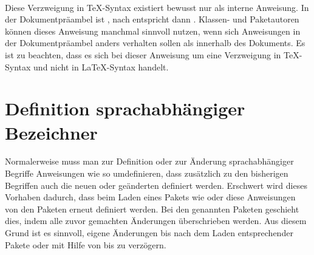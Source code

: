 \begin{Declaration}[0]
  \ \ %
  \  
\end{Declaration}
\iftrue%
Diese Verzweigung in \TeX-Syntax existiert bewusst nur als interne
Anweisung. In der Dokumentpräambel ist 
, nach  entspricht
 dann .  Klassen- und Paketautoren
können dieses Anweisung manchmal sinnvoll nutzen, %
\else%
In der Dokumentpräambel enspricht \Macro{if@atdocument} \iftrue dem Schalter
\fi \Macro{iffalse}, nach \Macro{begin}\PParameter{document} hingegen
\Macro{iftrue}.  Klassen- und Paketautoren können dieses Anweisung nutzen, %
\fi%
wenn sich Anweisungen in der Dokumentpräambel anders verhalten sollen als
innerhalb des Dokuments. Es ist zu beachten, dass es sich
bei dieser Anweisung um eine Verzweigung in \TeX-Syntax und nicht in
\LaTeX-Syntax handelt.%
\EndIndexGroup


\section{Definition sprachabhängiger Bezeichner}
\BeginIndexGroup
{}

\iffalse%
Anfänger haben häufig Probleme damit, sprachabhängige Begriffe wie
\Macro{listfigurename}\IndexCmd{listfigurename}, in der Voreinstellung meist
»List of Figures« beziehungsweise in Deutsch: »Abbildungsverzeichnis«, zu
ändern. Werden diese beispielsweise einfach mit \Macro{renewcommand} in der
Dokumentpräambel umdefiniert, so überleben sie eine spätere Umschaltung der
Sprache nicht. Bei Verwendung von \Package{babel}\IndexCmd{babel} wird die
Umdefinierung in der Dokumentpräambel bereits von
\Macro{begin}\PParameter{document} wieder überschrieben.
\fi

Normalerweise muss man zur Definition oder zur Änderung sprachabhängiger
Begriffe Anweisungen wie  so umdefinieren, dass
zusätzlich zu den bisherigen Begriffen auch die neuen oder geänderten
definiert werden. Erschwert wird dieses Vorhaben dadurch, dass beim Laden
eines Pakets wie  oder
 diese Anweisungen von den
Paketen erneut definiert werden. Bei den genannten Paketen geschieht dies,
indem alle zuvor gemachten Änderungen überschrieben werden. Aus diesem Grund
ist es sinnvoll, eigene Änderungen bis nach dem Laden entsprechender Pakete
oder mit Hilfe von  bis
 zu verzögern.

